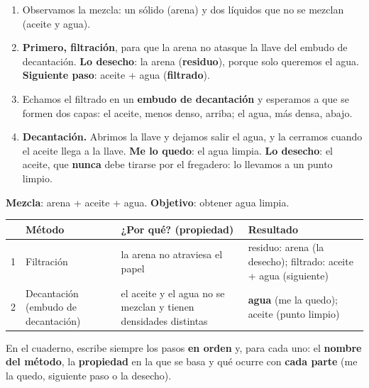 \begin{enumerate}[label=\numberballmDarkTeal]
    \item Observamos la mezcla: un sólido (arena) y dos líquidos que no se mezclan (aceite y agua).
    \item \textbf{Primero, filtración}, para que la arena no atasque la llave del embudo de decantación. \textcolor{red!70!black}{\textbf{Lo desecho}}: la arena (\textbf{residuo}), porque solo queremos el agua. \textcolor{blue!70!black}{\textbf{Siguiente paso}}: aceite + agua (\textbf{filtrado}).
    \item Echamos el filtrado en un \textbf{embudo de decantación} y esperamos a que se formen dos capas: el aceite, menos denso, arriba; el agua, más densa, abajo.
    \item \textbf{Decantación.} Abrimos la llave y dejamos salir el agua, y la cerramos cuando el aceite llega a la llave. \textcolor{green!50!black}{\textbf{Me lo quedo}}: el agua limpia. \textcolor{red!70!black}{\textbf{Lo desecho}}: el aceite, que \textbf{nunca} debe tirarse por el fregadero: lo llevamos a un punto limpio.
\end{enumerate}

\begin{tcolorbox}[enhanced, breakable, colback=yellow!6!white, colframe=ocre, boxrule=0.8pt, arc=2mm,
    fonttitle=\sffamily\bfseries, title={Cómo escribirlo en el cuaderno}]
    \textbf{Mezcla}: arena + aceite + agua. \quad \textbf{Objetivo}: obtener agua limpia.

    \begin{tabular}{@{}p{0.3cm}>{\raggedright\arraybackslash}p{2.9cm}>{\raggedright\arraybackslash}p{3.9cm}>{\raggedright\arraybackslash}p{4.2cm}@{}}
        \toprule
        & \textbf{Método} & \textbf{¿Por qué? (propiedad)} & \textbf{Resultado} \\
        \midrule
        1 & Filtración & la arena no atraviesa el papel & residuo: arena (la desecho); filtrado: aceite + agua (siguiente) \\
        2 & Decantación (embudo de decantación) & el aceite y el agua no se mezclan y tienen densidades distintas & \textbf{agua} (me la quedo); aceite (punto limpio) \\
        \bottomrule
    \end{tabular}
\end{tcolorbox}

\begin{marker}
    En el cuaderno, escribe siempre los pasos \textbf{en orden} y, para cada uno: el \textbf{nombre del método}, la \textbf{propiedad} en la que se basa y qué ocurre con \textbf{cada parte} (me la quedo, siguiente paso o la desecho).
\end{marker}

